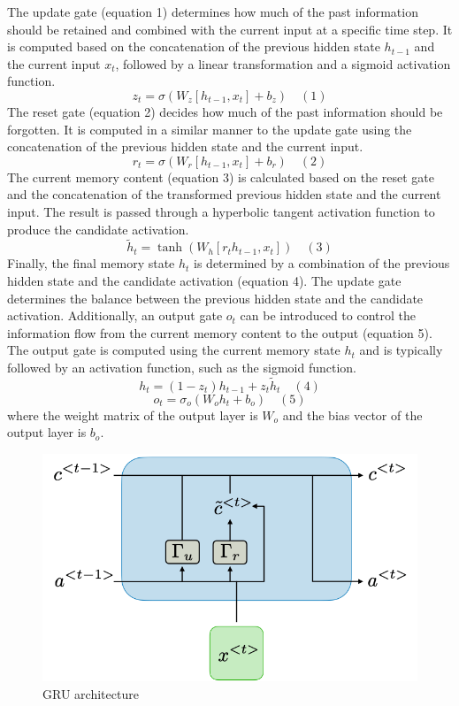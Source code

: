 \documentclass{ieeeojies}
\begin{document}
The update gate (equation 1) determines how much of
the past information should be retained and combined with
the current input at a specific time step. It is computed based
on the concatenation of the previous hidden state \( h_{t−1} \) and
the current input \( x_{t} \),
followed by a linear transformation and
a sigmoid activation function.
\[
z_{t} = \sigma(W_{z}
[h_{t−1}, x_{t}] + b_{z}) \quad (1)
\]
The reset gate (equation 2) decides how much of the past
information should be forgotten. It is computed in a similar
manner to the update gate using the concatenation of the
previous hidden state and the current input.
\[
r_{t} = \sigma(W_{r}
[h_{t−1}, x_{t}]+ b_{r}) \quad (2)
\]
The current memory content (equation 3) is calculated based
on the reset gate and the concatenation of the transformed
previous hidden state and the current input. The result is
passed through a hyperbolic tangent activation function to
produce the candidate activation.
\[
\tilde{h}_{t} = \tanh(W_{h}
[r_{t}h_{t−1}, x_{t}]) \quad (3)
\]
Finally, the final memory state \( h_{t} \)
is determined by a
combination of the previous hidden state and the candidate
activation (equation 4). The update gate determines the
balance between the previous hidden state and the candidate
activation. Additionally, an output gate \( o_{t} \) can be introduced
to control the information flow from the current memory
content to the output (equation 5). The output gate is
computed using the current memory state \( h_{t} \) and is typically
followed by an activation function, such as the sigmoid
function.
\[
h_{t} = (1 −z_{t})
h_{t−1} + z_{t}\tilde{h}_{t} \quad (4)
\]
\[
o_{t} = \sigma_{o}
(W_{o}h_{t} + b_{o}) \quad (5)
\]
where the weight matrix of the output layer is \( W_{o} \) and the bias
vector of the output layer is \( b_{o} \).\cite{Yamak}

\begin{figure}[H]
    \centering
\begin{minipage}{0.4\textwidth}
        \centering
        \includegraphics[width=\textwidth]{bibliography/Figure/gru-ltr.png}
        \caption{GRU architecture}
        \label{fig:3}
\end{minipage}
\end{figure}
\end{document}

